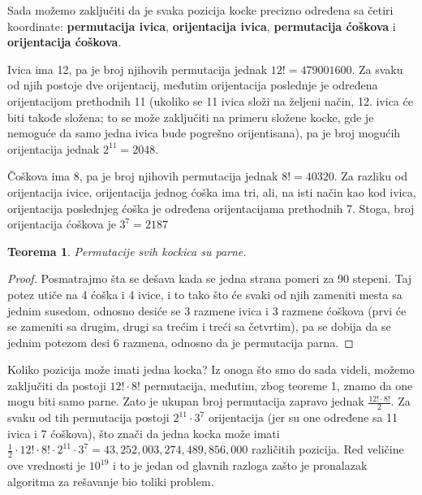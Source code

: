 \documentclass[a4paper]{article}
\newtheorem{teorema}{Teorema}
\begin{document}
Sada možemo zaključiti da je svaka pozicija kocke precizno određena sa četiri koordinate: \textbf{permutacija ivica}, \textbf{orijentacija ivica}, \textbf{permutacija ćoškova} i \textbf{orijentacija ćoškova}.

Ivica ima 12, pa je broj njihovih permutacija jednak $12! = 479 001 600$. Za svaku od njih postoje dve orijentacij, međutim orijentacija poslednje je određena orijentacijom prethodnih 11 (ukoliko se 11 ivica složi na željeni način, 12. ivica će biti takođe složena; to se može zaključiti na primeru složene kocke, gde je nemoguće da samo jedna ivica bude pogrešno orijentisana), pa je broj mogućih orijentacija jednak $2^{11} = 2048$.

Čoškova ima 8, pa je broj njihovih permutacija jednak $8! = 40320$. Za razliku od orijentacija ivice, orijentacija jednog ćoška ima tri, ali, na isti način kao kod ivica, orijentacija poslednjeg ćoška je određena orijentacijama prethodnih 7. Stoga, broj orijentacija ćoškova je $3^{7} = 2187$

\begin{teorema} Permutacije svih kockica su parne.
\end{teorema}
\begin{proof}
    Posmatrajmo šta se dešava kada se jedna strana pomeri za 90 stepeni. Taj potez utiče na 4 ćoška i 4 ivice, i to tako što će svaki od njih zameniti mesta sa jednim susedom, odnosno desiće se 3 razmene ivica i 3 razmene ćoškova (prvi će se zameniti sa drugim, drugi sa trećim i treći sa četvrtim), pa se dobija da se jednim potezom desi 6 razmena, odnosno da je permutacija parna.
\end{proof}

Koliko pozicija može imati jedna kocka? Iz onoga što smo do sada videli, možemo zaključiti da postoji $12! \cdot 8!$ permutacija, međutim, zbog teoreme 1, znamo da one mogu biti samo parne. Zato je ukupan broj permutacija zapravo jednak $\frac{12! \cdot 8!}{2}$. Za svaku od tih permutacija postoji $2^{11} \cdot 3^{7}$ orijentacija (jer su one određene sa 11 ivica i 7 ćoškova), što znači da jedna kocka može imati $\frac{1}{2} \cdot 12! \cdot 8! \cdot 2^{11} \cdot 3^7 = 43,252,003,274,489,856,000$ različitih pozicija. Red veličine ove vrednosti je $10^{19}$ i to je jedan od glavnih razloga zašto je pronalazak algoritma za rešavanje bio toliki problem.
\end{document}
